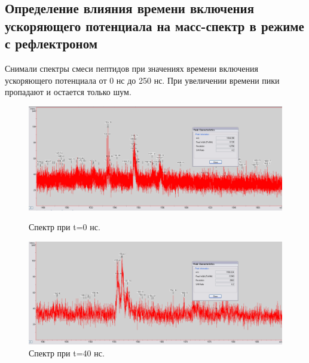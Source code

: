\documentclass[12pt]{article}
\begin{document}
\begin{flushleft}
\subsection{Определение влияния времени включения ускоряющего потенциала на масс-спектр в режиме с рефлектроном}
Снимали спектры смеси пептидов при значениях времени включения ускоряющего потенциала от 0 нс до 250 нс. При увеличении времени пики пропадают и остается только шум.
\begin{figure}[!h]
\begin{center}
\begin{minipage}[h]{0.4\linewidth}
\includegraphics[width=1.2\linewidth]{20}
\caption{Спектр при t=0 нс.} %
\label{ris:experimoriginal} %
\end{minipage}
\hfill 
\begin{minipage}[h]{0.4\linewidth}
\includegraphics[width=1.2\linewidth]{21}
\caption{Спектр при t=40 нс.}
\label{ris:experimcoded}
\end{minipage}
\end{center}
\end{figure}


\end{flushleft}
\end{document}
